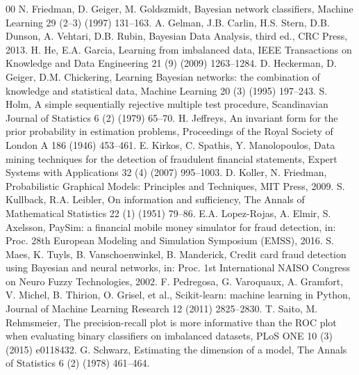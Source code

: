 \documentclass[final,5p,times,authoryear]{elsarticle}
\begin{document}
\begin{thebibliography}{00}
 N. Friedman, D. Geiger, M. Goldszmidt, Bayesian network classifiers, Machine Learning 29 (2--3) (1997) 131--163.
 A. Gelman, J.B. Carlin, H.S. Stern, D.B. Dunson, A. Vehtari, D.B. Rubin, Bayesian Data Analysis, third ed., CRC Press, 2013.
 H. He, E.A. Garcia, Learning from imbalanced data, IEEE Transactions on Knowledge and Data Engineering 21 (9) (2009) 1263--1284.
 D. Heckerman, D. Geiger, D.M. Chickering, Learning Bayesian networks: the combination of knowledge and statistical data, Machine Learning 20 (3) (1995) 197--243.
 S. Holm, A simple sequentially rejective multiple test procedure, Scandinavian Journal of Statistics 6 (2) (1979) 65--70.
 H. Jeffreys, An invariant form for the prior probability in estimation problems, Proceedings of the Royal Society of London A 186 (1946) 453--461.
 E. Kirkos, C. Spathis, Y. Manolopoulos, Data mining techniques for the detection of fraudulent financial statements, Expert Systems with Applications 32 (4) (2007) 995--1003.
 D. Koller, N. Friedman, Probabilistic Graphical Models: Principles and Techniques, MIT Press, 2009.
 S. Kullback, R.A. Leibler, On information and sufficiency, The Annals of Mathematical Statistics 22 (1) (1951) 79--86.
 E.A. Lopez-Rojas, A. Elmir, S. Axelsson, PaySim: a financial mobile money simulator for fraud detection, in: Proc. 28th European Modeling and Simulation Symposium (EMSS), 2016.
 S. Maes, K. Tuyls, B. Vanschoenwinkel, B. Manderick, Credit card fraud detection using Bayesian and neural networks, in: Proc. 1st International NAISO Congress on Neuro Fuzzy Technologies, 2002.
 F. Pedregosa, G. Varoquaux, A. Gramfort, V. Michel, B. Thirion, O. Grisel, et al., Scikit-learn: machine learning in Python, Journal of Machine Learning Research 12 (2011) 2825--2830.
 T. Saito, M. Rehmsmeier, The precision-recall plot is more informative than the ROC plot when evaluating binary classifiers on imbalanced datasets, PLoS ONE 10 (3) (2015) e0118432.
 G. Schwarz, Estimating the dimension of a model, The Annals of Statistics 6 (2) (1978) 461--464.

\end{thebibliography}
\end{document}
